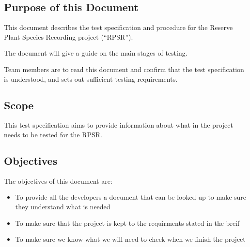 \subsection{Purpose of this Document}
	This document describes the test specification and procedure for the Reserve Plant Species Recording project (“RPSR”).

	The document will give a guide on the main stages of testing.

	Team members are to read this document and confirm that the test specification is understood, and sets out sufficient testing requirements.
\subsection{Scope}
	This test specification aims to provide  information about what in the project needs to be tested for the RPSR.
\subsection{Objectives}
	The objectives of this document are:
	\begin{itemize}
		\item To provide all the developers a document that can be looked up to make sure they understand what is needed
		\item To make sure that the project is kept to the requirments stated in the breif
		\item To make sure we know what we will need to check when we finish the project
	\end{itemize}
